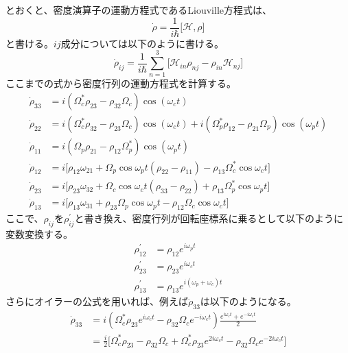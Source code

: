 \documentclass[dvipdfmx]{jsreport}
\begin{document}
とおくと、密度演算子の運動方程式であるLiouville方程式は、
\begin{equation}
\dot{\rho} = \frac{1}{i\hbar} \lbrack \mathcal{H}, \rho \rbrack
\end{equation}
と書ける。$ij$成分については以下のように書ける。
\begin{equation}
\dot{\rho}_{ij} = \frac{1}{i\hbar} \sum_{n=1}^3 \lbrack \mathcal{H}_{in} \rho_{nj} - \rho_{in}\mathcal{H}_{nj} \rbrack
\end{equation}
ここまでの式から密度行列の運動方程式を計算する。
\begin{align}
{\dot{\rho}_{33}} &= i\left( \Omega_c^* {\rho_{23}} - {\rho_{32}}\Omega_c \right) \cos{(\omega_c t)} \\
{\dot{\rho}_{22}} &= i\left( \Omega_c^* {\rho_{32}} - {\rho_{23}}\Omega_c \right) \cos{(\omega_c t)} + i\left( \Omega_p^* {\rho_{12}} - {\rho_{21}}\Omega_p \right) \cos{(\omega_p t)} \\
{\dot{\rho}_{11}} &= i\left( \Omega_p {\rho_{21}} - {\rho_{12}}\Omega_p^* \right) \cos{(\omega_p t)} \\
{\dot{\rho}_{12}} &= i\lbrack {\rho_{12}}\omega_{21} + \Omega_p \cos{\omega_p t} ({\rho_{22}} - {\rho_{11}}) - {\rho_{13}} \Omega_c^* \cos{\omega_c t} \rbrack \\
{\dot{\rho}_{23}} &= i\lbrack {\rho_{23}}\omega_{32} + \Omega_c \cos{\omega_c t} ({\rho_{33}} - {\rho_{22}}) + {\rho_{13}} \Omega_p^* \cos{\omega_p t} \rbrack \\
{\dot{\rho}_{13}} &= i\lbrack {\rho_{13}}\omega_{31} + {\rho_{23}}\Omega_p \cos{\omega_p t} - {\rho_{12}}\Omega_c \cos{\omega_c t}  \rbrack
\end{align}
ここで、${\rho_{ij}}$を${\rho_{ij}^{'}}$と書き換え、密度行列が回転座標系に乗るとして以下のように変数変換する。
\begin{equation}
\begin{split}
{\rho_{12}^{'}} &= \rho_{12}e^{i\omega_p t} \\
{\rho_{23}^{'}} &= \rho_{23}e^{i\omega_c t} \\
{\rho_{13}^{'}} &= \rho_{13}e^{i(\omega_p + \omega_c) t} 
\end{split}
\end{equation}
さらにオイラーの公式を用いれば、例えば${\dot{\rho}_{33}}$は以下のようになる。
\begin{equation}
\begin{split}
    \dot{\rho}_{33} &= i\left( \Omega_c^* {\rho_{23} e^{i\omega_c t}} - {\rho_{32}}\Omega_c e^{-i\omega_c t} \right) \frac{e^{i\omega_c t} + e^{-i\omega_c t}}{2} \\
    &= \frac{i}{2} \lbrack \Omega_c^* {\rho_{23}} -  {\rho_{32}}\Omega_c + \Omega_c^* {\rho_{23}e^{2i\omega_c t}} - {\rho_{32}}\Omega_c e^{-2i\omega_c t} \rbrack
\end{split}
\end{equation}
\end{document}

